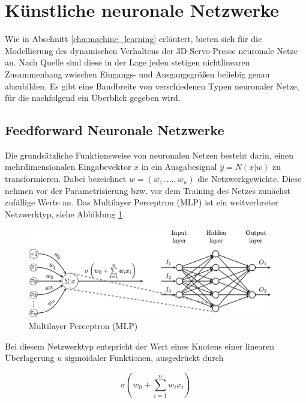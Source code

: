\section{Künstliche neuronale Netzwerke}

Wie in Abschnitt \ref{cha:machine_learning} erläutert, bieten sich für die Modellierung des dynamischen Verhaltens der 3D-Servo-Presse neuronale Netze an. Nach Quelle sind diese in der Lage jeden stetigen nichtlinearen Zusammenhang zwischen Eingangs- und Ausgangsgrößen beliebig genau abzubilden. Es gibt eine Bandbreite von verschiedenen Typen neuronaler Netze, für die nachfolgend ein Überblick gegeben wird. 

\subsection{Feedforward Neuronale Netzwerke}

Die grundsätzliche Funktionsweise von neuronalen Netzen besteht darin, einen mehrdimensionalen Eingabevektor $x$ in ein Ausgabesignal $\hat{y} = N(x|w)$ zu transformieren. Dabei bezeichnet $w = (w_1,...,w_n)$ die Netzwerkgewichte. Diese nehmen vor der Parametrisierung bzw. vor dem Training des Netzes zunächst zufällige Werte an. Das Multilayer Perceptron (MLP) ist ein weitverbreter Netzwerktyp, siehe Abbildung \ref{fig:mlp}. 

\begin{figure} 
	\centering
	\includegraphics[width=0.95\textwidth]{images/MLP}
	\caption{Multilayer Perceptron (MLP)}
	\label{fig:mlp}
\end{figure}


Bei diesem Netzwerktyp entspricht der Wert eines Knotens einer linearen Überlagerung $n$ sigmoidaler Funktionen, ausgedrückt durch 

\begin{equation} 
\label{eq:feedforward}
\sigma(w_0 + \sum_{i=1}^{n} w_i x_i)
\end{equation}

